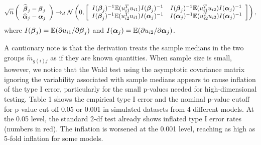 \documentclass{statsoc}
\begin{document}
\begin{eqnarray}
\sqrt{n} \left(\begin{array}{c} \widehat{\mbox{\boldmath $ \beta $}}_{j}  - \mbox{\boldmath $ \beta $}_{j} \\ \widehat{\mbox{\boldmath $ \alpha $}}_{j} - \mbox{\boldmath $ \alpha $}_{j} \end{array} \right) \rightarrow_d \mathcal{N}\left(0, \left[ \begin{array}{cc} I(\mbox{\boldmath $ \beta $}_{j})^{-1} \mathbb{E} (u_{i1}^Tu_{i1}) I(\mbox{\boldmath $ \beta $}_{j})^{-1} & I(\mbox{\boldmath $ \beta $}_{j})^{-1} \mathbb{E} (u_{i1}^Tu_{i2}) I(\mbox{\boldmath $ \alpha $}_{j})^{-1} \\ I(\mbox{\boldmath $ \beta $}_{j})^{-1} \mathbb{E} (u_{i2}^Tu_{i1}) I(\mbox{\boldmath $ \alpha $}_{j})^{-1} & I(\mbox{\boldmath $ \alpha $}_{j})^{-1} \mathbb{E} (u_{i2}^Tu_{i2}) I(\mbox{\boldmath $ \alpha $}_{j})^{-1} \end{array} \right] \right),  \label{asymp}
\end{eqnarray}
where $I(\mbox{\boldmath $ \beta $}_{j}) =  \mathbb{E} (\partial u_{i1}/\partial \mbox{\boldmath $ \beta $}_{j})$ and $I(\mbox{\boldmath $ \alpha $}_{j}) =  \mathbb{E} (\partial u_{i2}/\partial \mbox{\boldmath $ \alpha $}_{j})$.

A cautionary note is that the derivation treats the sample medians in the two groups $\widetilde{m}_{g(i)j}$ as if they are known quantities. When sample size is small, however, we notice that the Wald test using the asymptotic covariance matrix ignoring the variability associated with sample medians appears to cause inflation of the type I error, particularly for the small p-values needed for high-dimensional testing. Table 1 shows the empirical type I error and the nominal p-value cutoff for p-value cut-off 0.05 or 0.001 in simulated datasets from 4 different models. At the 0.05 level, the standard 2-df test already shows inflated type I error rates (numbers in red). The inflation is worsened at the 0.001 level, reaching as high as 5-fold inflation for some models.
\end{document}
